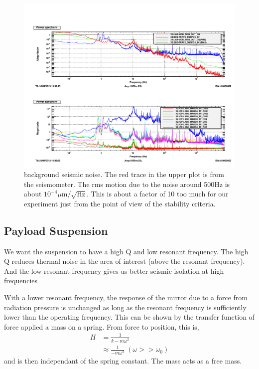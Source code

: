 \begin{figure}
\centering
  \includegraphics[width=15cm]{./figures/seismic130930.pdf}
  \caption[Background Seismic Noise]{
  background seismic noise.
  The red trace in the upper plot is from the seismometer.
  The rms motion due to the noise around 500Hz is about
  $10^{-4}\mu\mathrm{m}/\sqrt{\mathrm{Hz}}$.
  This is about a factor of 10 too much for our experiment
  just from the point of view of the stability criteria.
  }
  \label{fig:seismicnoise130930}
\end{figure}

\subsection{Payload Suspension}
\label{sec:highQsus}

We want the suspension to have a high Q and low resonant frequency.
The high Q reduces thermal noise in the area of interest
(above the resonant frequency).
And the low resonant frequency gives us better seismic isolation at high
frequencies

With a lower resonant frequency, the response of the mirror due to a force from
radiation pressure is unchanged as long as the resonant frequency is sufficiently lower than the operating frequency. This can be shown by the transfer function of force
applied a mass on a spring. From force to position, this is,
\begin{align}
H &= \frac{1}{k-m\omega^2} \\
  &\approx \frac{1}{-m\omega^2} \; (\omega >> \omega_0)
\end{align}
and is then independant of the spring constant.
The mass acts as a free mass.

